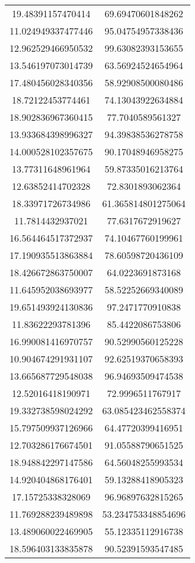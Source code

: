\begin{table}
\begin{tabular}{cc}
19.48391157470414 & 69.69470601848262 \\
11.024949337477446 & 95.04754957338436 \\
12.962529466950532 & 99.63082393153655 \\
13.546197073014739 & 63.56924524654964 \\
17.480456028340356 & 58.92908500080486 \\
18.72122453774461 & 74.13043922634884 \\
18.902836967360415 & 77.7040589561327 \\
13.933684398996327 & 94.39838536278758 \\
14.000528102357675 & 90.17048946958275 \\
13.77311648961964 & 59.87335016213764 \\
12.63852414702328 & 72.8301893062364 \\
18.33971726734986 & 61.365814801275064 \\
11.7814432937021 & 77.6317672919627 \\
16.564464517372937 & 74.10467760199961 \\
17.190935513863884 & 78.60598720436109 \\
18.426672863750007 & 64.0223691873168 \\
11.645952038693977 & 58.52252669340089 \\
19.651493924130836 & 97.2471770910838 \\
11.83622293781396 & 85.4422086753806 \\
16.990081416970757 & 90.52990560125228 \\
10.904674291931107 & 92.62519370658393 \\
13.665687729548038 & 96.94693509474538 \\
12.52016418190971 & 72.9996511767917 \\
19.332738598024292 & 63.085423462558374 \\
15.797509937126966 & 64.47720399416951 \\
12.703286176674501 & 91.05588790651525 \\
18.948842297147586 & 64.56048255993534 \\
14.920404868176401 & 59.13288418905323 \\
17.15725338328069 & 96.96897632815265 \\
11.769288239489898 & 53.234753348854696 \\
13.489060022469905 & 55.12335112916738 \\
18.596403133835878 & 90.52391593547485 \\

\end{tabular}
\end{table}
